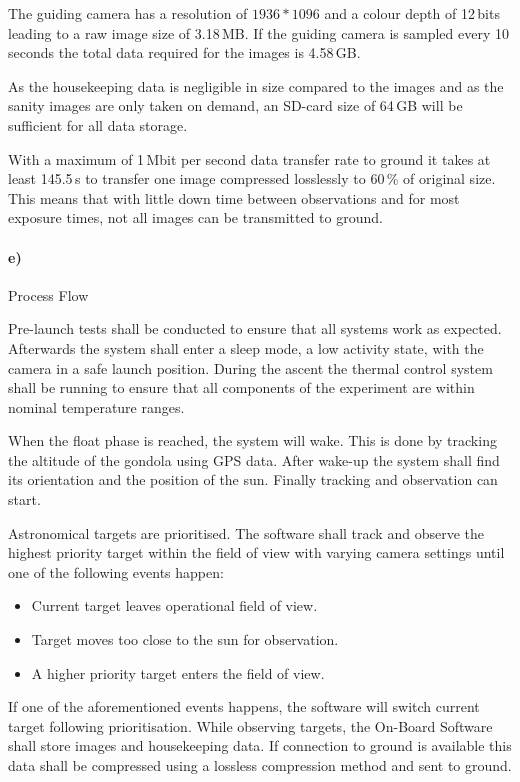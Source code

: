 The guiding camera has a resolution of $1936 * 1096$ and a colour depth of 12\,bits leading to a raw image size of 3.18\,MB. If the guiding camera is sampled every 10\,seconds the total data required for the images is 4.58\,GB.

As the housekeeping data is negligible in size compared to the images and as the sanity images are only taken on demand, an SD-card size of 64\,GB will be sufficient for all data storage.

With a maximum of 1\,Mbit per second data transfer rate to ground it takes at least 145.5\,s to transfer one image compressed losslessly to 60\,\% of original size. This means that with little down time between observations and for most exposure times, not all images can be transmitted to ground.

\paragraph{e)} Process Flow

Pre-launch tests shall be conducted to ensure that all systems work as expected. Afterwards the system shall enter a sleep mode, a low activity state, with the camera in a safe launch position. During the ascent the thermal control system shall be running to ensure that all components of the experiment are within nominal temperature ranges.

When the float phase is reached, the system will wake. This is done by tracking the altitude of the gondola using GPS data. After wake-up the system shall find its orientation and the position of the sun. Finally tracking and observation can start.

Astronomical targets are prioritised. The software shall track and observe the highest priority target within the field of view with varying camera settings until one of the following events happen:

\begin{itemize}
	\item Current target leaves operational field of view.
	\item Target moves too close to the sun for observation.
	\item A higher priority target enters the field of view.
\end{itemize}

If one of the aforementioned events happens, the software will switch current target following prioritisation. While observing targets, the On-Board Software shall store images and housekeeping data. If connection to ground is available this data shall be compressed using a lossless compression method and sent to ground.

